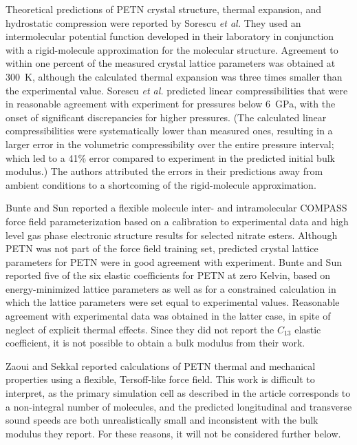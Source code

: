 \documentclass[prb,aps,nobibnotes,twocolumn,doublespace,twocolumngrid,superbib]{revtex4}
\begin{document}
Theoretical predictions of PETN crystal structure, thermal expansion,
and hydrostatic compression were reported by Sorescu {\it et
al.}\cite{Sorescu_1999v103A, Sorescu_1999v103} They used an
intermolecular potential function developed in their laboratory in
conjunction with a rigid-molecule approximation for the molecular
structure. Agreement to within one percent of the measured crystal
lattice parameters was obtained at 300~K, although the calculated
thermal expansion was three times smaller than the experimental value.
Sorescu {\it et al.}\cite{Sorescu_1999v103} predicted linear
compressibilities that were in reasonable agreement with experiment
for pressures below 6~GPa, with the onset of significant discrepancies
for higher pressures.  (The calculated linear compressibilities were
systematically lower than measured ones, resulting in a larger error
in the volumetric compressibility over the entire pressure interval;
which led to a 41\% error compared to experiment in the predicted
initial bulk modulus.) The authors attributed the errors in their
predictions away from ambient conditions to a shortcoming of the
rigid-molecule approximation.

Bunte and Sun\cite{Bunte_2000v104} reported a flexible molecule inter-
and intramolecular COMPASS force field parameterization based on a
calibration to experimental data and high level gas phase electronic
structure results for selected nitrate esters.  Although PETN was not
part of the force field training set, predicted crystal lattice
parameters for PETN were in good agreement with experiment.  Bunte and
Sun reported five of the six elastic coefficients for PETN at zero
Kelvin, based on energy-minimized lattice parameters as well as for a
constrained calculation in which the lattice parameters were set equal
to experimental values.  Reasonable agreement with experimental data
was obtained in the latter case, in spite of neglect of explicit
thermal effects.  Since they did not report the $C_{13}$ elastic
coefficient, it is not possible to obtain a bulk modulus from their
work.

Zaoui and Sekkal\cite{Zaoui_2001v118} reported calculations of PETN
thermal and mechanical properties using a flexible, Tersoff-like force
field.  This work is difficult to interpret, as the primary simulation
cell as described in the article corresponds to a non-integral number
of molecules, and the predicted longitudinal and transverse sound
speeds are both unrealistically small and inconsistent with the bulk
modulus they report.  For these reasons, it will not be considered
further below.
\end{document}
